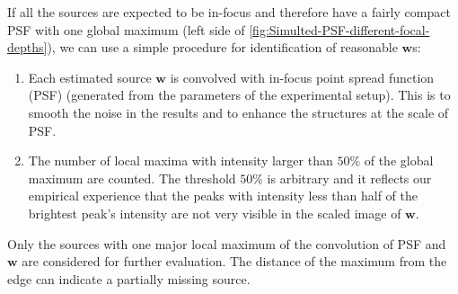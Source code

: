 If all the sources are expected to be in-focus and therefore have a fairly compact PSF with one global maximum (left side of \autoref{fig:Simulted-PSF-different-focal-depths}), we can use a simple procedure for identification of reasonable $\bm{w}$s:
%
\begin{enumerate}
	\item
	Each estimated source $\bm{w}$ is convolved with in-focus point spread function (PSF) (generated from the parameters of the experimental setup). This is to smooth the noise in the results and to enhance the structures at the scale of PSF. 
	\item
	The number of local maxima with intensity larger than $50\%$ of the global maximum are counted. The threshold $50\%$ is arbitrary and it reflects our empirical experience that the peaks with intensity less than half of the brightest peak's intensity are not very visible in the scaled image of $\bm{w}$.
\end{enumerate}

Only the sources with one major local maximum of the convolution of PSF and $\bm{w}$ are considered for further evaluation. The distance of the maximum from the edge can indicate a partially missing source. 

